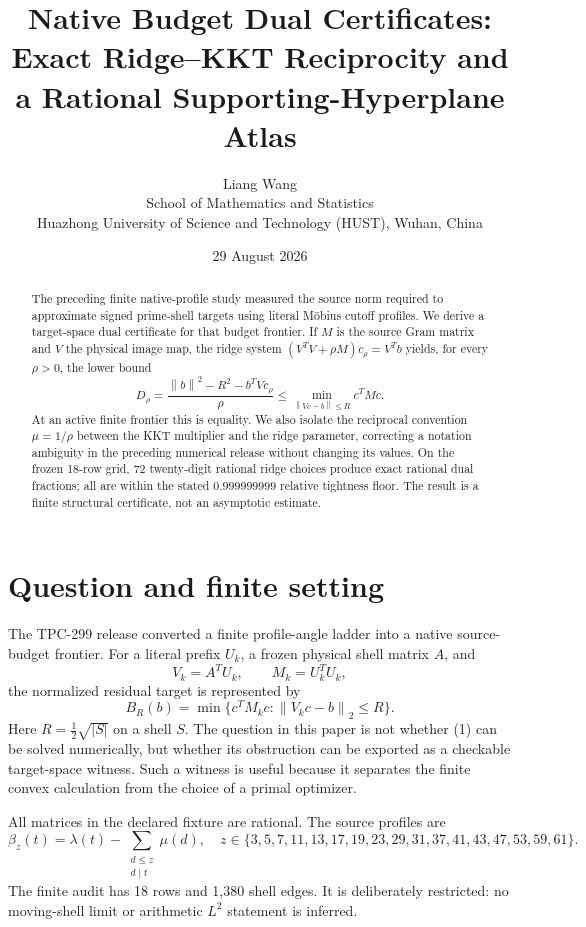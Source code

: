\documentclass[11pt]{article}
\title{Native Budget Dual Certificates:\\
Exact Ridge--KKT Reciprocity and a Rational Supporting-Hyperplane Atlas}
\author{Liang Wang\\
School of Mathematics and Statistics\\
Huazhong University of Science and Technology (HUST), Wuhan, China}
\date{29 August 2026}
\newcommand{\norm}[1]{\left\lVert #1\right\rVert}
\begin{document}
\maketitle

\begin{abstract}
The preceding finite native-profile study measured the source norm required
to approximate signed prime-shell targets using literal Möbius cutoff
profiles.  We derive a target-space dual certificate for that budget
frontier.  If $M$ is the source Gram matrix and $V$ the physical image map,
the ridge system $(V^{T}V+\rho M)c_\rho=V^{T}b$ yields, for every
$\rho>0$, the lower bound
\[
 D_\rho=\frac{\norm{b}^2-R^2-b^TVc_\rho}{\rho}
 \leq \min_{\norm{Vc-b}\leq R}c^TMc.
\]
At an active finite frontier this is equality.  We also isolate the
reciprocal convention $\mu=1/\rho$ between the KKT multiplier and the ridge
parameter, correcting a notation ambiguity in the preceding numerical
release without changing its values.  On the frozen 18-row grid, 72
twenty-digit rational ridge choices produce exact rational dual fractions;
all are within the stated $0.999999999$ relative tightness floor.  The
result is a finite structural certificate, not an asymptotic estimate.
\end{abstract}

\section{Question and finite setting}

The TPC-299 release \cite{tpc299} converted a finite profile-angle ladder
into a native source-budget frontier.  For a literal prefix $U_k$, a frozen
physical shell matrix $A$, and
\[
 V_k=A^TU_k,\qquad M_k=U_k^TU_k,
\]
the normalized residual target is represented by
\[
 B_R(b)=\min\{c^TM_kc:\norm{V_kc-b}_2\leq R\}.                 \tag{1}
\]
Here $R=\frac12\sqrt{|S|}$ on a shell $S$.  The question in this paper is
not whether (1) can be solved numerically, but whether its obstruction can
be exported as a checkable target-space witness.  Such a witness is useful
because it separates the finite convex calculation from the choice of a
primal optimizer.

All matrices in the declared fixture are rational.  The source profiles are
\[
 \beta_z(t)=\lambda(t)-\sum_{\substack{d\leq z\\d\mid t}}\mu(d),
\quad
 z\in\{3,5,7,11,13,17,19,23,29,31,37,41,43,47,53,59,61\}.
                                                               \tag{2}
\]
The finite audit has 18 rows and 1,380 shell edges.  It is deliberately
restricted: no moving-shell limit or arithmetic $L^2$ statement is inferred.
\end{document}
